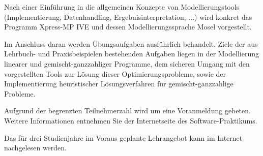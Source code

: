 \begin{course}
\begin{learningoutcomes}
\end{learningoutcomes}

\begin{content}
Nach einer Einführung in die allgemeinen Konzepte von Modellierungstools (Implementierung, Datenhandling, Ergebnisinterpretation, ...) wird konkret das Programm Xpress-MP IVE und dessen Modellierungssprache Mosel vorgestellt.

 

Im Anschluss daran werden Übungsaufgaben ausführlich behandelt. Ziele der aus Lehrbuch- und Praxisbeispielen bestehenden Aufgaben liegen in der Modellierung linearer und gemischt-ganzzahliger Programme, dem sicheren Umgang mit den vorgestellten Tools zur Lösung dieser Optimierungsprobleme, sowie der Implementierung heuristischer Lösungsverfahren für gemischt-ganzzahlige Probleme.


\end{content}





\begin{remarks}Aufgrund der begrenzten Teilnehmerzahl wird um eine Voranmeldung gebeten. Weitere Informationen entnehmen Sie der Internetseite des Software-Praktikums.

 

Das für drei Studienjahre im Voraus geplante Lehrangebot kann im Internet nachgelesen werden.

\end{remarks}

\end{course}